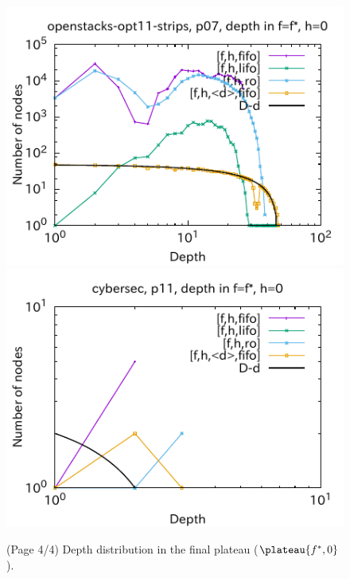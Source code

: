 \begin{figure}[htbp]
\includegraphics{img/output-lmcut/openstacks-opt11-strips/p07.pdf}
\includegraphics{img/output-lmcut/cybersec/p11.pdf}
 \caption{(Page 4/4) Depth distribution in the final plateau ($\plateau{f^*,0}$).}
 \label{fig:depth-histogram4}
\end{figure}

